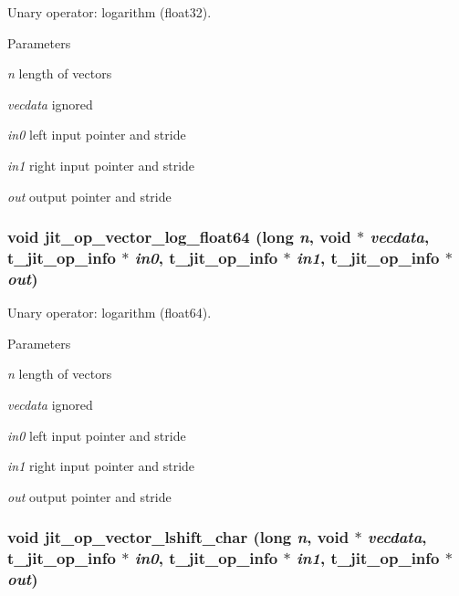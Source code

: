Unary operator: logarithm (float32). 
\begin{DoxyParams}{Parameters}
\item[{\em n}]length of vectors \item[{\em vecdata}]ignored \item[{\em in0}]left input pointer and stride \item[{\em in1}]right input pointer and stride \item[{\em out}]output pointer and stride \end{DoxyParams}
\hypertarget{group__opvecmod_ga9d662157694e9cf219851e07c5d95955}{
\subsubsection[{jit\_\-op\_\-vector\_\-log\_\-float64}]{\setlength{\rightskip}{0pt plus 5cm}void jit\_\-op\_\-vector\_\-log\_\-float64 (long {\em n}, \/  void $\ast$ {\em vecdata}, \/  {\bf t\_\-jit\_\-op\_\-info} $\ast$ {\em in0}, \/  {\bf t\_\-jit\_\-op\_\-info} $\ast$ {\em in1}, \/  {\bf t\_\-jit\_\-op\_\-info} $\ast$ {\em out})}}
\label{group__opvecmod_ga9d662157694e9cf219851e07c5d95955}


Unary operator: logarithm (float64). 
\begin{DoxyParams}{Parameters}
\item[{\em n}]length of vectors \item[{\em vecdata}]ignored \item[{\em in0}]left input pointer and stride \item[{\em in1}]right input pointer and stride \item[{\em out}]output pointer and stride \end{DoxyParams}
\hypertarget{group__opvecmod_gaf0577b49b43ab67181b56cc80afec1fa}{
\subsubsection[{jit\_\-op\_\-vector\_\-lshift\_\-char}]{\setlength{\rightskip}{0pt plus 5cm}void jit\_\-op\_\-vector\_\-lshift\_\-char (long {\em n}, \/  void $\ast$ {\em vecdata}, \/  {\bf t\_\-jit\_\-op\_\-info} $\ast$ {\em in0}, \/  {\bf t\_\-jit\_\-op\_\-info} $\ast$ {\em in1}, \/  {\bf t\_\-jit\_\-op\_\-info} $\ast$ {\em out})}}
\label{group__opvecmod_gaf0577b49b43ab67181b56cc80afec1fa}



